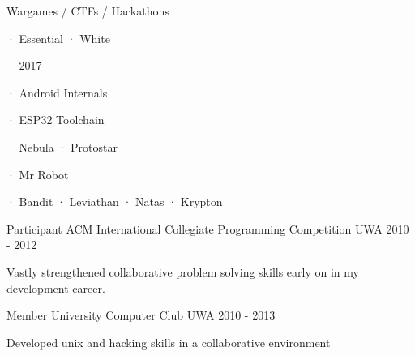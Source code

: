 \begin{cventries}
    \cventry
        {Wargames / CTFs / Hackathons}
        {}
        {}
        {}
        {
          \begin{cvitems}
            \item { · Essential · White}
            \item { · 2017}
            \item { · Android Internals}
            \item { · ESP32 Toolchain}
            \item { · Nebula · Protostar}
            \item { · Mr Robot}
            \item { · Bandit · Leviathan · Natas · Krypton}
          \end{cvitems}
        }

  \cventry
    {Participant} %
    {ACM International Collegiate Programming Competition} %
    {UWA} %
    {2010 - 2012} %
    {
      \begin{cvitems} %
        \item {Vastly strengthened collaborative problem solving skills early on in my development career.}
      \end{cvitems}
    }

  \cventry
    {Member} %
    {University Computer Club} %
    {UWA} %
    {2010 - 2013} %
    {
      \begin{cvitems} %
        \item {Developed unix and hacking skills in a collaborative environment}
      \end{cvitems}
    }

\end{cventries}
